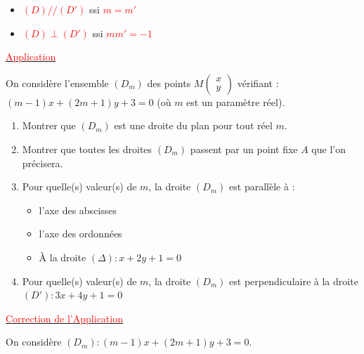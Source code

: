 \documentclass[12pt,a4paper]{article}
\begin{document}
\begin{itemize}
    \item[i)] \textcolor{red}{$(D) // (D')$} ssi \textcolor{red}{$m = m'$}
    \item[ii)] \textcolor{red}{$(D) \perp (D')$} ssi \textcolor{red}{$mm' = -1$}
\end{itemize}

\vspace{0.5cm}

\begin{center}
    \underline{\textcolor{red}{Application}}
\end{center}

\noindent On considère l'ensemble $(D_m)$ des points $M \begin{pmatrix} x \\ y \end{pmatrix}$ vérifiant : \\
$(m-1)x + (2m+1)y + 3 = 0$ (où $m$ est un paramètre réel).

\begin{enumerate}
    \item Montrer que $(D_m)$ est une droite du plan pour tout réel $m$.
    \item Montrer que toutes les droites $(D_m)$ passent par un point fixe $A$ que l'on précisera.
    \item Pour quelle(s) valeur(s) de $m$, la droite $(D_m)$ est parallèle à :
    \begin{itemize}
        \item[a)] l'axe des abscisses
        \item[b)] l'axe des ordonnées
        \item[c)] À la droite $(\Delta) : x + 2y + 1 = 0$
    \end{itemize}
    \item Pour quelle(s) valeur(s) de $m$, la droite $(D_m)$ est perpendiculaire à la droite $(D') : 3x + 4y + 1 = 0$
\end{enumerate}


\begin{center}
    \underline{\textcolor{red}{Correction de l'Application}}
\end{center}

On considère $(D_m) : (m-1)x + (2m+1)y + 3 = 0$.
\end{document}
